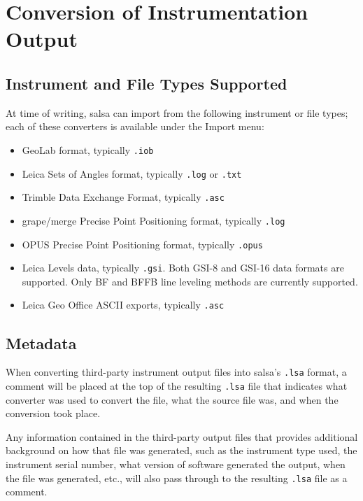 \chapter{Conversion of Instrumentation Output}
\label{chap:converters} %

\section*{Instrument and File Types Supported}
At time of writing, \textsf{salsa} can import from the following instrument or file types; each of these converters is available under the Import menu:
\begin{itemize}
\item GeoLab format, typically \verb+.iob+
\item Leica Sets of Angles format, typically \verb+.log+ or \verb+.txt+
\item Trimble Data Exchange Format, typically \verb+.asc+
\item grape/merge Precise Point Positioning format, typically \verb+.log+
\item OPUS Precise Point Positioning format, typically \verb+.opus+
\item Leica Levels data, typically \verb+.gsi+. Both GSI-8 and GSI-16 data formats are supported.  Only BF and BFFB line leveling methods are currently supported.
\item Leica Geo Office ASCII exports, typically \verb+.asc+
\end{itemize}

\section*{Metadata}
When converting third-party instrument output files into \textsf{salsa}'s \verb+.lsa+ format, a comment will be placed at the top of the resulting \verb+.lsa+ file that indicates what converter was used to convert the file, what the source file was, and when the conversion took place.

Any information contained in the third-party output files that provides additional background on how that file was generated, such as the instrument type used, the instrument serial number, what version of software generated the output, when the file was generated, etc., will also pass through to the resulting \verb+.lsa+ file as a comment.

